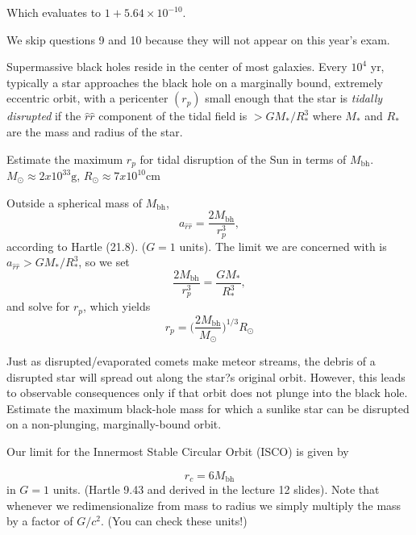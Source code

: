 \documentclass[11pt,largemargins]{homework}
\begin{document}
Which evaluates to $1 + 5.64 \times 10^{-10}$.

\color{red}
We skip questions 9 and 10 because they will not appear on this year's exam.
\color{black} 
\setcounter{questionCounter}{10}

\question
Supermassive black holes reside in the center of most galaxies.  Every $10^4$ yr, typically a star approaches the black hole on a marginally bound, extremely eccentric orbit, with a pericenter $(r_p)$ small enough that the star is \textit{tidally disrupted} if the $\hat{r}\hat{r}$ component of the tidal field is $>GM_{*}/R_{*}^{3}$ where $M_*$ and $R_*$ are the mass and radius of the star.
\begin{alphaparts}
\questionpart
Estimate the maximum $r_p$ for tidal disruption of the Sun in terms of $M_{\mathrm{bh}}$.  $M_{\odot} \approx 2 x 10^{33} \mathrm{g}$, $R_{\odot} \approx 7 x 10^{10} \mathrm{cm}$

Outside a spherical mass of $M_{\mathrm{bh}}$,
\begin{equation}
a_{\hat{r}\hat{r}} = \frac{2M_{\mathrm{bh}}}{r_{p}^{3}},
\end{equation}
according to Hartle (21.8). ($G = 1$ units).  The limit we are concerned with is $a_{\hat{r}\hat{r}} > GM_{*}/R_{*}^{3}$, so we set 
\begin{equation}
\frac{2M_{\mathrm{bh}}}{r_{p}^{3}} = \frac{G M_{*}}{R_{*}^{3}},
\end{equation} 
and solve for $r_{p}$, which yields
\begin{equation}
r_{p} = \bigg(\frac{2 M_\mathrm{bh}}{M_{\odot}} \bigg) ^ {1/3} R_{\odot}
\end{equation}

\questionpart
Just as disrupted/evaporated comets make meteor streams, the debris of a disrupted
star will spread out along the star?s original orbit. However, this leads to
observable consequences only if that orbit does not plunge into the black hole. Estimate the maximum black-hole mass for which a sunlike star can be disrupted on a
non-plunging, marginally-bound orbit.

Our limit for the Innermost Stable Circular Orbit (ISCO) is given by 

\begin{equation}
r_{c} = 6M_{\mathrm{bh}}
\end{equation}
in $G = 1$ units.  (Hartle 9.43 and derived in the lecture 12 slides).  Note that whenever we redimensionalize from mass to radius we simply multiply the mass by a factor of $G/c^2$.  (You can check these units!)


\end{alphaparts}
\end{document}
